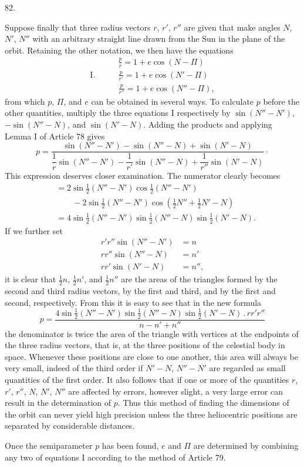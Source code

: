 \par{}\medskip
\hypertarget{native-111-article082}{}
\begin{center}82.\end{center}
Suppose finally that three radius vectors $r$, $r'$, $r''$ are given that make angles $N$, $N'$, $N''$ with an arbitrary straight line drawn from the Sun in the plane of the orbit. Retaining the other notation, we then have the equations
\[
\begin{aligned}
&\frac{p}{r}=1+e\cos(N-\Pi)\\[4pt]
\mathrm{I.}\qquad&\frac{p}{r'}=1+e\cos(N'-\Pi)\\[4pt]
&\frac{p}{r''}=1+e\cos(N''-\Pi),
\end{aligned}
\]
from which $p$, $\Pi$, and $e$ can be obtained in several ways. To calculate $p$ before the other quantities, multiply the three equations I respectively by $\sin(N''-N')$, $-\sin(N''-N)$, and $\sin(N'-N)$. Adding the products and applying Lemma I of Article 78 gives
\[
p=\frac{\sin(N''-N')-\sin(N''-N)+\sin(N'-N)}{\dfrac1r\sin(N''-N')-\dfrac1{r'}\sin(N''-N)+\dfrac1{r''}\sin(N'-N)}\mathpunct{\cdot}
\]
This expression deserves closer examination. The numerator clearly becomes
\[
\begin{aligned}
&=2\sin\tfrac12(N''-N')\cos\tfrac12(N''-N')\\
&\qquad-2\sin\tfrac12(N''-N')\cos(\tfrac12N''+\tfrac12N'-N)\\
&=4\sin\tfrac12(N''-N')\sin\tfrac12(N''-N)\sin\tfrac12(N'-N).
\end{aligned}
\]
If we further set
\[
\begin{aligned}
r'r''\sin(N''-N')&=n\\
rr''\sin(N''-N)&=n'\\
rr'\sin(N'-N)&=n'',
\end{aligned}
\]
it is clear that $\tfrac12n$, $\tfrac12n'$, and $\tfrac12n''$ are the areas of the triangles formed by the second and third radius vectors, by the first and third, and by the first and second, respectively. From this it is easy to see that in the new formula
\[
p=\frac{4\sin\tfrac12(N''-N')\sin\tfrac12(N''-N)\sin\tfrac12(N'-N)\mathbin{.}rr'r''}{n-n'+n''}
\]
the denominator is twice the area of the triangle with vertices at the endpoints of the three radius vectors, that is, at the three positions of the celestial body in space. Whenever these positions are close to one another, this area will always be very small, indeed of the third order if $N'-N$, $N''-N'$ are regarded as small quantities of the first order. It also follows that if one or more of the quantities $r$, $r'$, $r''$, $N$, $N'$, $N''$ are affected by errors, however slight, a very large error can result in the determination of $p$. Thus this method of finding the dimensions of the orbit can never yield high precision unless the three heliocentric positions are separated by considerable distances.

Once the semiparameter $p$ has been found, $e$ and $\Pi$ are determined by combining any two of equations I according to the method of Article 79.
